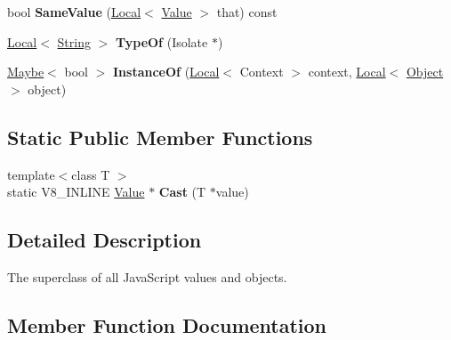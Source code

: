 \begin{DoxyCompactItemize}
\item 
\mbox{\label{classv8_1_1Value_a7c90dc5947b8b99b9089a020fff6d86d}} 
bool {\bfseries Same\+Value} (\mbox{\hyperlink{classv8_1_1Local}{Local}}$<$ \mbox{\hyperlink{classv8_1_1Value}{Value}} $>$ that) const
\item 
\mbox{\label{classv8_1_1Value_aa216d09720605b79b1d429cf1eef6050}} 
\mbox{\hyperlink{classv8_1_1Local}{Local}}$<$ \mbox{\hyperlink{classv8_1_1String}{String}} $>$ {\bfseries Type\+Of} (Isolate $\ast$)
\item 
\mbox{\label{classv8_1_1Value_a48f7a0f11ca7ae0e8b13968e7b00f76a}} 
\mbox{\hyperlink{classv8_1_1Maybe}{Maybe}}$<$ bool $>$ {\bfseries Instance\+Of} (\mbox{\hyperlink{classv8_1_1Local}{Local}}$<$ Context $>$ context, \mbox{\hyperlink{classv8_1_1Local}{Local}}$<$ \mbox{\hyperlink{classv8_1_1Object}{Object}} $>$ object)
\end{DoxyCompactItemize}
\subsection*{Static Public Member Functions}
\begin{DoxyCompactItemize}
\item 
\mbox{\label{classv8_1_1Value_ae5aa9b54ebed55819c3a4b2a3eb5fe12}} 
{\footnotesize template$<$class T $>$ }\\static V8\+\_\+\+I\+N\+L\+I\+NE \mbox{\hyperlink{classv8_1_1Value}{Value}} $\ast$ {\bfseries Cast} (T $\ast$value)
\end{DoxyCompactItemize}


\subsection{Detailed Description}
The superclass of all Java\+Script values and objects. 

\subsection{Member Function Documentation}
\mbox{\label{classv8_1_1Value_a7d6045d6333598e79c9ab7d2898a9eb5}} 
